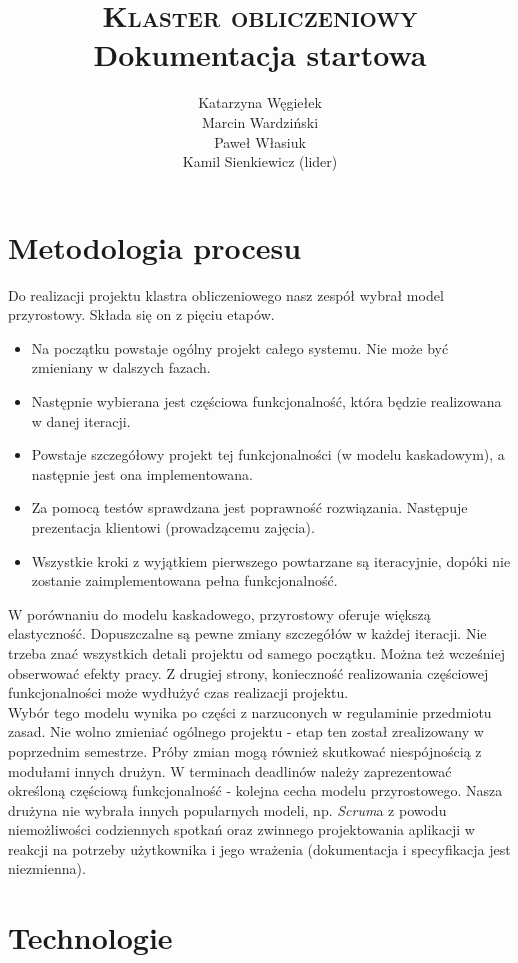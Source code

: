 \documentclass[a4paper]{article}
\title{\textsc{Klaster obliczeniowy}\\Dokumentacja startowa}
\author{Katarzyna Węgiełek\\Marcin Wardziński\\Paweł Własiuk\\Kamil Sienkiewicz (lider)}
\begin{document}
	\maketitle
	
	\section{Metodologia procesu}	
	Do realizacji projektu klastra obliczeniowego nasz zespół wybrał model przyrostowy. Składa się on z pięciu etapów.
	\begin{itemize}
		\item Na początku powstaje ogólny projekt całego systemu. Nie może być zmieniany w dalszych fazach.
		\item Następnie wybierana jest częściowa funkcjonalność, która będzie realizowana w danej iteracji.
		\item Powstaje szczegółowy projekt tej funkcjonalności (w modelu kaskadowym), a następnie jest ona implementowana.
		\item Za pomocą testów sprawdzana jest poprawność rozwiązania. Następuje prezentacja klientowi (prowadzącemu zajęcia).
		\item Wszystkie kroki z wyjątkiem pierwszego powtarzane są iteracyjnie, dopóki nie zostanie zaimplementowana pełna funkcjonalność.
	\end{itemize}
	
	W porównaniu do modelu kaskadowego, przyrostowy oferuje większą elastyczność. Dopuszczalne są pewne zmiany szczegółów w każdej iteracji. Nie trzeba znać wszystkich detali projektu od samego początku. Można też wcześniej obserwować efekty pracy. Z drugiej strony, konieczność realizowania częściowej funkcjonalności może wydłużyć czas realizacji projektu.\\
	
	Wybór tego modelu wynika po części z narzuconych w regulaminie przedmiotu zasad. Nie wolno zmieniać ogólnego projektu - etap ten został zrealizowany w poprzednim semestrze. Próby zmian mogą również skutkować niespójnością z modułami innych drużyn. W terminach deadlinów należy zaprezentować określoną częściową funkcjonalność - kolejna cecha modelu przyrostowego. Nasza drużyna nie wybrała innych popularnych modeli, np. \textit{Scrum}a z powodu niemożliwości codziennych spotkań oraz zwinnego projektowania aplikacji w reakcji na potrzeby użytkownika i jego wrażenia (dokumentacja i specyfikacja jest niezmienna). 
	
	\section{Technologie}
	
\end{document}
